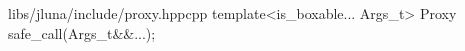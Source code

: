 \begin{fileminted}{libs/jluna/include/proxy.hpp}{cpp}
template<is_boxable... Args_t>
Proxy safe_call(Args_t&&...);
\end{fileminted}